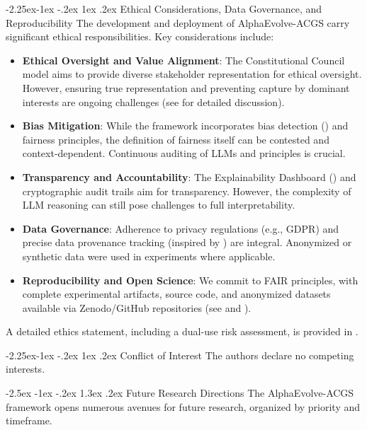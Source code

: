 \documentclass[manuscript,screen,review,anonymous,9pt]{acmart}
\makeatletter
\renewcommand\section{\@startsection{section}{1}{\z@}%
  {-2.5ex \@plus -1ex \@minus -.2ex}%
  {1.3ex \@plus.2ex}%
  {\normalfont\Large\bfseries}}
\renewcommand\subsection{\@startsection{subsection}{2}{\z@}%
  {-2.25ex\@plus -1ex \@minus -.2ex}%
  {1ex \@plus .2ex}%
  {\normalfont\large\bfseries}}
\makeatother
\begin{document}
\subsection{Ethical Considerations, Data Governance, and Reproducibility}
\label{subsec:ethics_governance_reproducibility}
The development and deployment of AlphaEvolve-ACGS carry significant ethical responsibilities. Key considerations include:
\begin{itemize}[leftmargin=*,itemsep=1pt,parsep=1pt]
    \item \textbf{Ethical Oversight and Value Alignment}: The Constitutional Council model aims to provide diverse stakeholder representation for ethical oversight. However, ensuring true representation and preventing capture by dominant interests are ongoing challenges (see  for detailed discussion).
    \item \textbf{Bias Mitigation}: While the framework incorporates bias detection () and fairness principles, the definition of fairness itself can be contested and context-dependent. Continuous auditing of LLMs and principles is crucial.
    \item \textbf{Transparency and Accountability}: The Explainability Dashboard () and cryptographic audit trails aim for transparency. However, the complexity of LLM reasoning can still pose challenges to full interpretability.
    \item \textbf{Data Governance}: Adherence to privacy regulations (e.g., GDPR) and precise data provenance tracking (inspired by \cite{Gebru2021DatasheetDatasets}) are integral. Anonymized or synthetic data were used in experiments where applicable.
    \item \textbf{Reproducibility and Open Science}: We commit to FAIR principles, with complete experimental artifacts, source code, and anonymized datasets available via Zenodo/GitHub repositories (see  and ).
\end{itemize}
A detailed ethics statement, including a dual-use risk assessment, is provided in .

\subsection{Conflict of Interest}
The authors declare no competing interests.

\section{Future Research Directions}
\label{sec:future_work}
The AlphaEvolve-ACGS framework opens numerous avenues for future research, organized by priority and timeframe.
\end{document}
